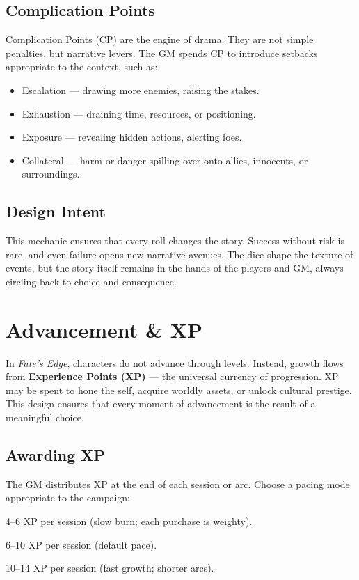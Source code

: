 \documentclass[12pt]{book}
\begin{document}
\section{Complication Points}

Complication Points (CP) are the engine of drama. They are not simple penalties, but narrative levers.  
The GM spends CP to introduce setbacks appropriate to the context, such as:

\begin{itemize}
  \item Escalation — drawing more enemies, raising the stakes.  
  \item Exhaustion — draining time, resources, or positioning.  
  \item Exposure — revealing hidden actions, alerting foes.  
  \item Collateral — harm or danger spilling over onto allies, innocents, or surroundings.  
\end{itemize}

\section{Design Intent}

This mechanic ensures that every roll changes the story. Success without risk is rare, and even failure opens new narrative avenues. The dice shape the texture of events, but the story itself remains in the hands of the players and GM, always circling back to choice and consequence.

\chapter{Advancement \& XP}

In \textit{Fate’s Edge}, characters do not advance through levels. 
Instead, growth flows from \textbf{Experience Points (XP)} --- the universal currency of progression. 
XP may be spent to hone the self, acquire worldly assets, or unlock cultural prestige. 
This design ensures that every moment of advancement is the result of a meaningful choice.

\section{Awarding XP}

The GM distributes XP at the end of each session or arc. 
Choose a pacing mode appropriate to the campaign:

\begin{description}[leftmargin=2cm]
  \item[Gritty:] 4--6 XP per session (slow burn; each purchase is weighty).  
  \item[Standard:] 6--10 XP per session (default pace).  
  \item[Heroic:] 10--14 XP per session (fast growth; shorter arcs).  
\end{description}
\end{document}
